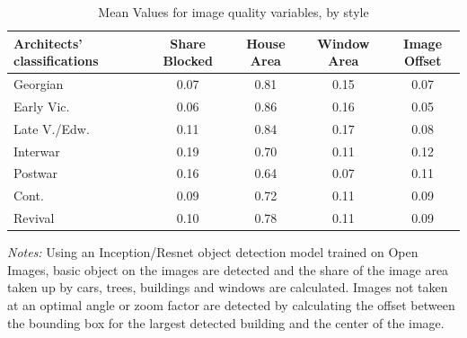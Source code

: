 \documentclass[]{article}
\begin{document}
\begin{table}[ht] 
\centering 
 \caption{Mean Values for image quality variables, by style}
\label{tab:imgqualsumstats}
\begin{tabular}{lcccc} 
\toprule 
Architects' classifications & Share Blocked & House Area & Window Area & Image Offset \\ 
\midrule
 Georgian & 0.07 & 0.81 & 0.15 & 0.07 \\ 
 Early Vic. & 0.06 & 0.86 & 0.16 & 0.05 \\ 
 Late V./Edw. & 0.11 & 0.84 & 0.17 & 0.08 \\ 
 Interwar & 0.19 & 0.70 & 0.11 & 0.12 \\ 
 Postwar & 0.16 & 0.64 & 0.07 & 0.11 \\ 
 Cont. & 0.09 & 0.72 & 0.11 & 0.09 \\ 
 Revival & 0.10 & 0.78 & 0.11 & 0.09 \\ 
 \bottomrule
\end{tabular}
\begin{minipage}{0.9\textwidth}
\vspace{0.25cm}
\footnotesize \emph{Notes:} Using an Inception/Resnet object detection model trained on Open Images, basic object on the images are detected and the share of the image area taken up by cars, trees, buildings and windows are calculated. Images not taken at an optimal angle or zoom factor are detected by calculating the offset between the bounding box for the largest detected building and the center of the image.
\end{minipage}
\end{table}

\newpage
\clearpage
\end{document}
